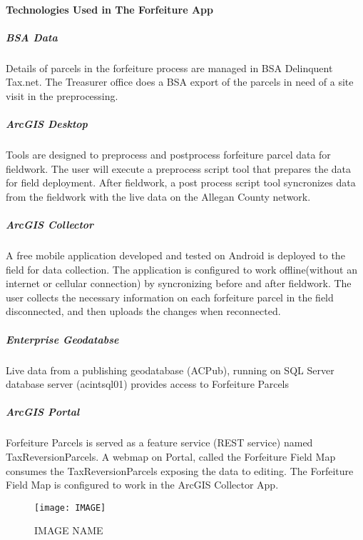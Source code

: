 \paragraph{Technologies Used in The Forfeiture App}
\begin{adjmulticols}{2}{\innerMar}{\outerMar}
\subparagraph{BSA Data}
\noindent Details of parcels in the forfeiture process are managed in BSA Delinquent Tax.net.  The Treasurer office does a BSA export of the parcels in need of a site visit in the preprocessing.
\subparagraph{ArcGIS Desktop}\noindent Tools are designed to preprocess and postprocess forfeiture parcel data for fieldwork.  The user will execute a preprocess script tool that prepares the data for field deployment.  After fieldwork, a post process script tool syncronizes data from the fieldwork with the live data on the Allegan County network.
\subparagraph{ArcGIS Collector}\noindent A free mobile application developed and tested on Android is deployed to the field for data collection.  The application is configured to work offline(without an internet or cellular connection) by syncronizing before and after fieldwork. The user collects the necessary information on each forfeiture parcel in the field disconnected, and then uploads the changes when reconnected.
\subparagraph{Enterprise Geodatabse}\noindent Live data from a publishing geodatabase (ACPub), running on SQL Server database server (acintsql01) provides access to Forfeiture Parcels
\subparagraph{ArcGIS Portal} \noindent Forfeiture Parcels is served as a feature service (REST service)  named TaxReversionParcels.  A webmap on Portal, called the Forfeiture Field Map consumes the TaxReversionParcels exposing the data to editing.  The Forfeiture Field Map is configured to work in the ArcGIS Collector App.
\end{adjmulticols}
\begin{figure}[H]
\centering
    \texttt{[image: IMAGE]}
\vspace{-.2in}

\caption{IMAGE NAME}
\end{figure}
\clearpage



